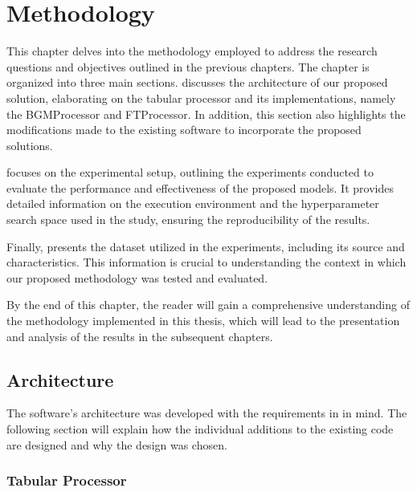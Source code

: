 \chapter{Methodology}
\label{ch:methodology}

This chapter delves into the methodology employed to address the research questions and objectives outlined in the previous chapters.
The chapter is organized into three main sections.
 discusses the architecture of our proposed solution, elaborating on the tabular processor and its implementations, namely the BGMProcessor and FTProcessor.
In addition, this section also highlights the modifications made to the existing software to incorporate the proposed solutions.

 focuses on the experimental setup, outlining the experiments conducted to evaluate the performance and effectiveness of the proposed models.
It provides detailed information on the execution environment and the hyperparameter search space used in the study, ensuring the reproducibility of the results.

Finally,  presents the dataset utilized in the experiments, including its source and characteristics.
This information is crucial to understanding the context in which our proposed methodology was tested and evaluated.

By the end of this chapter, the reader will gain a comprehensive understanding of the methodology implemented in this thesis, which will lead to the presentation and analysis of the results in the subsequent chapters.

\section{Architecture}
\label{ch:architecture}

The software's architecture was developed with the requirements in  in mind.
The following section will explain how the individual additions to the existing code are designed and why the design was chosen.


\subsection{Tabular Processor}
\label{ch:architecture-tabularProcessor}

